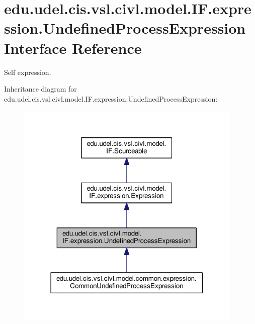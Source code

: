 \hypertarget{interfaceedu_1_1udel_1_1cis_1_1vsl_1_1civl_1_1model_1_1IF_1_1expression_1_1UndefinedProcessExpression}{}\section{edu.\+udel.\+cis.\+vsl.\+civl.\+model.\+I\+F.\+expression.\+Undefined\+Process\+Expression Interface Reference}
\label{interfaceedu_1_1udel_1_1cis_1_1vsl_1_1civl_1_1model_1_1IF_1_1expression_1_1UndefinedProcessExpression}


Self expression.  




Inheritance diagram for edu.\+udel.\+cis.\+vsl.\+civl.\+model.\+I\+F.\+expression.\+Undefined\+Process\+Expression\+:
\nopagebreak
\begin{figure}[H]
\begin{center}
\leavevmode
\includegraphics[width=306pt]{interfaceedu_1_1udel_1_1cis_1_1vsl_1_1civl_1_1model_1_1IF_1_1expression_1_1UndefinedProcessExpression__inherit__graph}
\end{center}
\end{figure}


